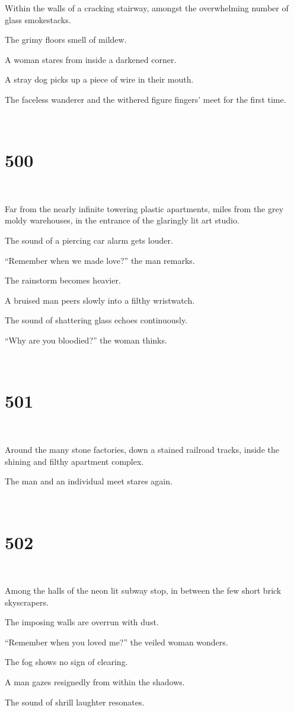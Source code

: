 \documentclass{report}
\begin{document}
Within the walls of a cracking stairway, amongst the overwhelming number of glass smokestacks.

The grimy floors smell of mildew.

A woman stares from inside a darkened corner.

A stray dog picks up a piece of wire in their mouth.

The faceless wanderer and the withered figure fingers' meet for the first time.

~
\chapter*{500}
~

Far from the nearly infinite towering plastic apartments, miles from the grey moldy warehouses, in the entrance of the glaringly lit art studio.

The sound of a piercing car alarm gets louder.

``Remember when we made love?'' the man remarks.

The rainstorm becomes heavier.

A bruised man peers slowly into a filthy wristwatch.

The sound of shattering glass echoes continuously.

``Why are you bloodied?'' the woman thinks.

~
\chapter*{501}
~

Around the many stone factories, down a stained railroad tracks, inside the shining and filthy apartment complex.

The man and an individual meet stares again.

~
\chapter*{502}
~

Among the halls of the neon lit subway stop, in between the few short brick skyscrapers.

The imposing walls are overrun with dust.

``Remember when you loved me?'' the veiled woman wonders.

The fog shows no sign of clearing.

A man gazes resignedly from within the shadows.

The sound of shrill laughter resonates.
\end{document}
